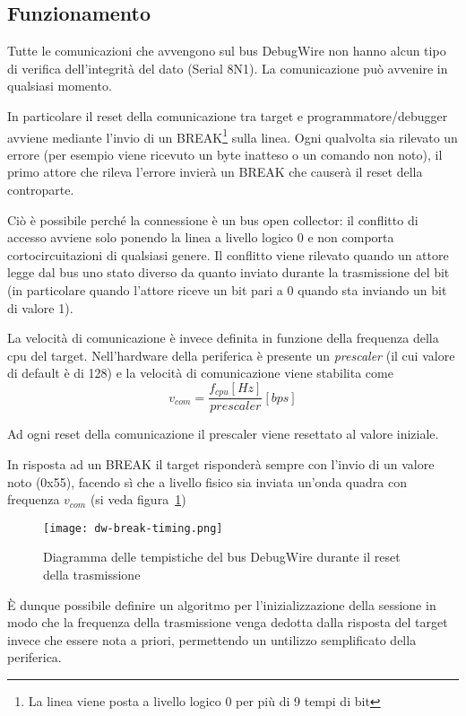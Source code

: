 \subsection{Funzionamento}

Tutte le comunicazioni che avvengono sul bus DebugWire non hanno alcun tipo di verifica dell'integrità del dato (Serial 8N1). La comunicazione può avvenire in qualsiasi momento.

In particolare il reset della comunicazione tra target e programmatore/debugger avviene mediante l'invio di un BREAK\footnote{La linea viene posta a livello logico 0 per più di 9 tempi di bit} sulla linea.
Ogni qualvolta sia rilevato un errore (per esempio viene ricevuto un byte inatteso o un comando non noto), il primo attore che rileva l'errore invierà un BREAK che causerà il reset della controparte.

Ciò è possibile perché la connessione è un bus open collector: il conflitto di accesso avviene solo ponendo la linea a livello logico 0 e non comporta cortocircuitazioni di qualsiasi genere. Il conflitto viene rilevato quando un attore legge dal bus uno stato diverso da quanto inviato durante la trasmissione del bit (in particolare quando l'attore riceve un bit pari a 0 quando sta inviando un bit di valore 1).

La velocità di comunicazione è invece definita in funzione della frequenza della cpu del target. Nell'hardware della periferica è presente un \textit{prescaler} (il cui valore di default è di 128) e la velocità di comunicazione viene stabilita come \[v_{com} = \frac{f_{cpu} [Hz]}{prescaler}[bps]\]

Ad ogni reset della comunicazione il prescaler viene resettato al valore iniziale.

In risposta ad un BREAK il target risponderà sempre con l'invio di un valore noto (0x55), facendo sì che a livello fisico sia inviata un'onda quadra con frequenza \(v_{com}\)\cite{site:dw-reverse-engeneering} (si veda figura~\ref{fig:dw-timings})

\begin{figure}[ht]
    \centering
    \texttt{[image: dw-break-timing.png]}
    \caption[]{Diagramma delle tempistiche del bus DebugWire durante il reset della trasmissione}\label{fig:dw-timings}
\end{figure}

È dunque possibile definire un algoritmo per l'inizializzazione della sessione in modo che la frequenza della trasmissione venga dedotta dalla risposta del target invece che essere nota a priori, permettendo un untilizzo semplificato della periferica.


